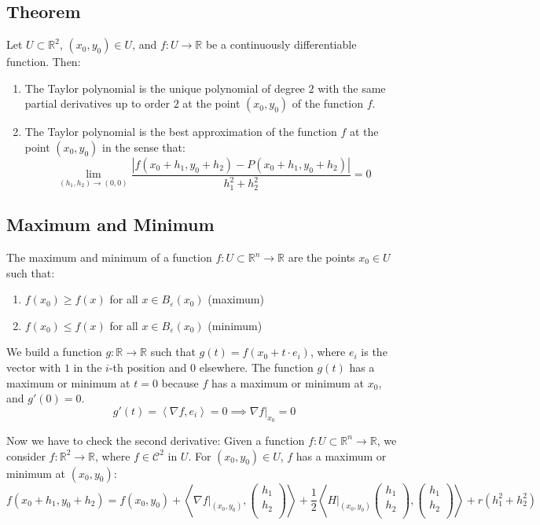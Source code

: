 \documentclass[11pt]{article}
\newcommand{\inner}[2]{\left\langle #1, #2 \right\rangle}
\begin{document}
\subsection{Theorem}
Let $U \subset \mathbb{R}^2$, $(x_0,y_0) \in U$, and $f : U \rightarrow \mathbb{R}$ be a continuously differentiable function. Then:
\begin{enumerate}
    \item The Taylor polynomial is the unique polynomial of degree $2$ with the same partial derivatives up to order $2$ at the point $(x_0,y_0)$ of the function $f$.
    \item The Taylor polynomial is the best approximation of the function $f$ at the point $(x_0,y_0)$ in the sense that:
    \[
    \lim_{(h_1,h_2) \rightarrow (0,0)} \frac{|f(x_0 + h_1, y_0 + h_2) - P(x_0 + h_1, y_0 + h_2)|}{h_1^2 + h_2^2} = 0
    \]
\end{enumerate}

\subsection{Maximum and Minimum}
The maximum and minimum of a function $f : U \subset \mathbb{R}^n \rightarrow \mathbb{R}$ are the points $x_0 \in U$ such that:
\begin{enumerate}
    \item $f(x_0) \geq f(x)$ for all $x \in B_{\varepsilon}(x_0)$ (maximum)
    \item $f(x_0) \leq f(x)$ for all $x \in B_{\varepsilon}(x_0)$ (minimum)
\end{enumerate}

We build a function $g : \mathbb{R} \rightarrow \mathbb{R}$ such that $g(t) = f(x_0 + t \cdot e_i)$, where $e_i$ is the vector with $1$ in the $i$-th position and $0$ elsewhere. The function $g(t)$ has a maximum or minimum at $t=0$ because $f$ has a maximum or minimum at $x_0$, and $g'(0) = 0$.
\[
g'(t) = \inner{\nabla f}{e_i} = 0 \implies \nabla f\big|_{x_0} = 0
\]

Now we have to check the second derivative:
Given a function $f : U \subset \mathbb{R}^n \rightarrow \mathbb{R}$, we consider $f : \mathbb{R}^2 \rightarrow \mathbb{R}$, where $f \in \mathcal{C}^2$ in $U$. For $(x_0,y_0) \in U$, $f$ has a maximum or minimum at $(x_0,y_0)$:
\[
f(x_0 + h_1, y_0 + h_2) = f(x_0,y_0) + \inner{\nabla f\big|_{(x_0,y_0)}}{\begin{pmatrix}
    h_1 \\
    h_2 \\
\end{pmatrix}} + \frac{1}{2} \inner{H\big|_{(x_0,y_0)}\begin{pmatrix}
    h_1 \\
    h_2 \\
\end{pmatrix}}{\begin{pmatrix}
    h_1 \\
    h_2 \\
\end{pmatrix}} + r(h_1^2 + h_2^2)
\]
\end{document}
